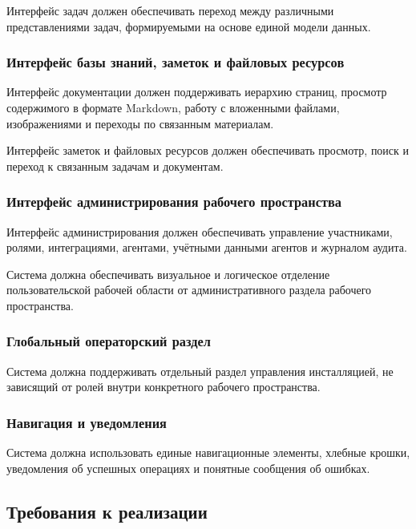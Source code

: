 Интерфейс задач должен обеспечивать переход между различными представлениями задач, формируемыми на основе единой модели данных.

\subsubsection{Интерфейс базы знаний, заметок и файловых ресурсов}

Интерфейс документации должен поддерживать иерархию страниц, просмотр содержимого в формате Markdown, работу с вложенными файлами, изображениями и переходы по связанным материалам.

Интерфейс заметок и файловых ресурсов должен обеспечивать просмотр, поиск и переход к связанным задачам и документам.

\subsubsection{Интерфейс администрирования рабочего пространства}

Интерфейс администрирования должен обеспечивать управление участниками, ролями, интеграциями, агентами, учётными данными агентов и журналом аудита.

Система должна обеспечивать визуальное и логическое отделение пользовательской рабочей области от административного раздела рабочего пространства.

\subsubsection{Глобальный операторский раздел}

Система должна поддерживать отдельный раздел управления инсталляцией, не зависящий от ролей внутри конкретного рабочего пространства.

\subsubsection{Навигация и уведомления}

Система должна использовать единые навигационные элементы, хлебные крошки, уведомления об успешных операциях и понятные сообщения об ошибках.

\textheadingsep
\subsection{Требования к реализации}

\headingtextsep

